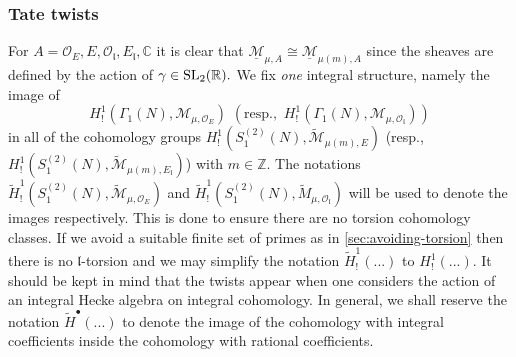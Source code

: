 \documentclass[11pt]{amsart}
\newcommand{\fl}{\mathfrak l}
\begin{document}
\subsubsection{Tate twists}  For $A = \mathcal{O}_E, E, \mathcal{O}_\mathfrak{l}, E_\mathfrak{l}, \mathbb{C}$ it is clear that 
$\underline{\mathcal{M}}_{\mu,A} \cong \underline{\mathcal{M}}_{\mu(m),A}$ since the sheaves are defined by the action of 
$\gamma \in {\rm SL}_2(\mathbb{R}).$ We fix \textit{one} integral structure, namely the image of 
\begin{equation}
	H^1_!(\Gamma_1(N), {\mathcal{M}}_{\mu,\mathcal{O}_E}) \,\, (\text{resp}., \,\, H^1_!(\Gamma_1(N), {\mathcal{M}}_{\mu,\mathcal{O}_\mathfrak{l}}) )
\end{equation} 
in all of the cohomology groups 
$H^1_!(S_1^{(2)}(N), \widetilde{\mathcal{M}}_{\mu(m),E})$ 
(resp., $H^1_!(S_1^{(2)}(N), \widetilde{\mathcal{M}}_{\mu(m),E_\mathfrak{l}})$) with $m \in \mathbb{Z}.$ The notations
$\tilde{H}^1_!(S^{(2)}_1(N), \widetilde{\mathcal{M}}_{\mu,\mathcal{O}_E})$ and $\tilde{H}^1_!(S^{(2)}_1(N), \widetilde{M}_{\mu,\mathcal{O}_\mathfrak{l}})$ 
will be used to denote the images respectively. This is done to ensure there are no torsion cohomology classes. If we avoid a suitable finite set of primes as in 
\ref{sec:avoiding-torsion} then there is no $\fl$-torsion and we may simplify the notation $\tilde{H}^1_!(...)$ to  $H^1_!(...)$. 
It should be kept in mind that 
the twists appear when one considers the action of an integral Hecke algebra on integral cohomology. 
In general, we shall reserve the notation $\tilde{H}^\bullet(...)$ to denote the image of the cohomology with integral coefficients inside the 
cohomology with rational coefficients. 
\end{document}
